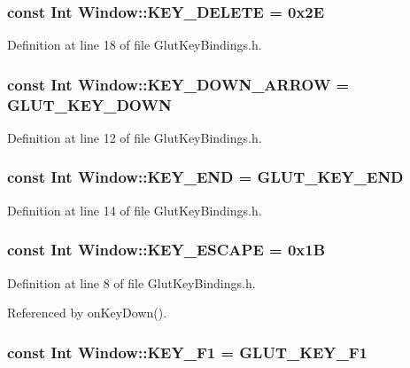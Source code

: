 \subsubsection{\setlength{\rightskip}{0pt plus 5cm}const {\bf Int} Window::KEY\_\-DELETE = 0x2E\hspace{0.3cm}{\tt  [static]}}\label{classdg_1_1Window_p10}




Definition at line 18 of file Glut\-Key\-Bindings.h.
\subsubsection{\setlength{\rightskip}{0pt plus 5cm}const {\bf Int} Window::KEY\_\-DOWN\_\-ARROW = GLUT\_\-KEY\_\-DOWN\hspace{0.3cm}{\tt  [static]}}\label{classdg_1_1Window_p4}




Definition at line 12 of file Glut\-Key\-Bindings.h.
\subsubsection{\setlength{\rightskip}{0pt plus 5cm}const {\bf Int} Window::KEY\_\-END = GLUT\_\-KEY\_\-END\hspace{0.3cm}{\tt  [static]}}\label{classdg_1_1Window_p6}




Definition at line 14 of file Glut\-Key\-Bindings.h.
\subsubsection{\setlength{\rightskip}{0pt plus 5cm}const {\bf Int} Window::KEY\_\-ESCAPE = 0x1B\hspace{0.3cm}{\tt  [static]}}\label{classdg_1_1Window_p0}




Definition at line 8 of file Glut\-Key\-Bindings.h.

Referenced by on\-Key\-Down().
\subsubsection{\setlength{\rightskip}{0pt plus 5cm}const {\bf Int} Window::KEY\_\-F1 = GLUT\_\-KEY\_\-F1\hspace{0.3cm}{\tt  [static]}}\label{classdg_1_1Window_p11}




